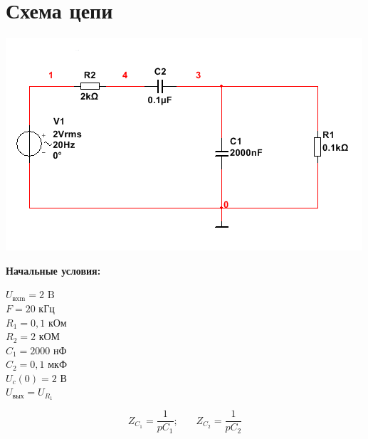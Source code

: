 \documentclass[12pt, a4paper]{report}
\begin{document}
    \section{\textbf{Схема цепи}}
    \begin{center}
        \includegraphics[scale = 3]{photo.png}\\
    \end{center}
    \textbf{Начальные условия:}
    \begin{itemize}
        $U_\text{вxm} = 2 \text{ B}$\\
        $F = 20 \text{ кГц}$\\
        $R_1 = 0,1 \text{ кОм}$\\
        $R_2 = 2 \text{ кОМ}$\\
        $C_1 = 2000 \text{ нФ}$\\
        $C_2 = 0,1 \text{ мкФ}$\\
        $U_{c}(0) = 2 \text{ В}$\\
        $U_\text{вых} = U_{R_1}$\\
    \end{itemize}
    \[ Z_{C_1} = \frac{1}{pC_1}; \>\>\>\>\>\>\>\> Z_{C_2} = \frac{1}{pC_2} \]

    \newpage
\end{document}
